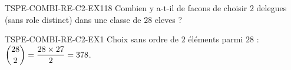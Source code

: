 

\begin{exercice}{TSPE-COMBI-RE-C2-EX1}{1}{8}
Combien y a-t-il de facons de choisir $2$ delegues (sans role distinct) dans une classe de $28$ eleves ?
\end{exercice}


\begin{corrige}{TSPE-COMBI-RE-C2-EX1}
Choix sans ordre de $2$ éléments parmi $28$ : $\dbinom{28}{2} = \dfrac{28\times27}{2} = 378$.
\end{corrige}
